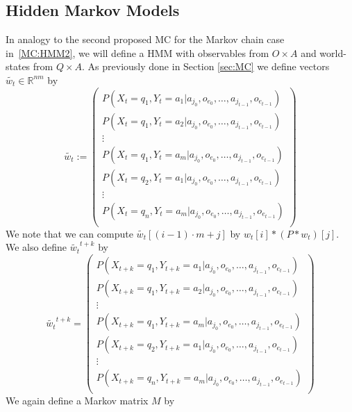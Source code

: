 \documentclass{article}
\theoremstyle{definition}
\def\mc{Markov chain}
\begin{document}
\subsection{Hidden Markov Models}
In analogy to the second proposed MC for the {\mc} case in~\ref{MC:HMM2}, we will define  a HMM with observables from $O\times A$ and world-states from $Q\times A$. As previously done in Section \ref{sec:MC} we define vectors $\widetilde{w_t}\in \mathbb{R}^{nm}$ by 
\[
\widetilde{w_t}:=\left ( \begin{matrix}
P(X_t=q_1,Y_t=a_1|a_{j_0},o_{e_0},\ldots,a_{j_{t-1}},o_{e_{t-1}}) \\
P(X_t=q_1,Y_t=a_2|a_{j_0},o_{e_0},\ldots,a_{j_{t-1}},o_{e_{t-1}}) \\ 
\vdots \\
P(X_t=q_1,Y_t=a_m|a_{j_0},o_{e_0},\ldots,a_{j_{t-1}},o_{e_{t-1}}) \\
P(X_t=q_2,Y_t=a_1|a_{j_0},o_{e_0},\ldots,a_{j_{t-1}},o_{e_{t-1}}) \\
\vdots \\
P(X_t=q_n,Y_t=a_m|a_{j_0},o_{e_0},\ldots,a_{j_{t-1}},o_{e_{t-1}}) \\
\end{matrix}
\right )
\]
We note that we can compute $\widetilde{w_t}[(i-1) \cdot m+j]$ by $w_t[i]*(P*w_t)[j]$. We also define $\widetilde{w_t}^{t+k}$ by 
\[
\widetilde{w_t}^{t+k}=\left ( \begin{matrix}
P(X_{t+k}=q_1,Y_{t+k}=a_1|a_{j_0},o_{e_0},\ldots,a_{j_{t-1}},o_{e_{t-1}}) \\
P(X_{t+k}=q_1,Y_{t+k}=a_2|a_{j_0},o_{e_0},\ldots,a_{j_{t-1}},o_{e_{t-1}}) \\ 
\vdots \\
P(X_{t+k}=q_1,Y_{t+k}=a_m|a_{j_0},o_{e_0},\ldots,a_{j_{t-1}},o_{e_{t-1}}) \\
P(X_{t+k}=q_2,Y_{t+k}=a_1|a_{j_0},o_{e_0},\ldots,a_{j_{t-1}},o_{e_{t-1}}) \\
\vdots \\
P(X_{t+k}=q_n,Y_{t+k}=a_m|a_{j_0},o_{e_0},\ldots,a_{j_{t-1}},o_{e_{t-1}}) \\
\end{matrix}
\right )
\]
We again define a Markov matrix $M$ by 
\end{document}
